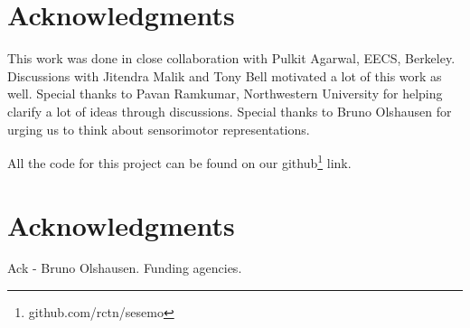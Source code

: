 \documentclass[conference]{IEEEtran}
\begin{document}
\section{ Acknowledgments} 

This work was done in close collaboration with Pulkit Agarwal, EECS, Berkeley. Discussions with Jitendra Malik and Tony Bell motivated a lot of this work as well. Special thanks to Pavan Ramkumar, Northwestern University for helping clarify a lot of ideas through discussions. Special thanks to Bruno Olshausen for urging us to think about sensorimotor representations. 

All the code for this project can be found on our github\footnote{github.com/rctn/sesemo} link.

\section{Acknowledgments}
Ack - Bruno Olshausen. Funding agencies. 




\end{document}
